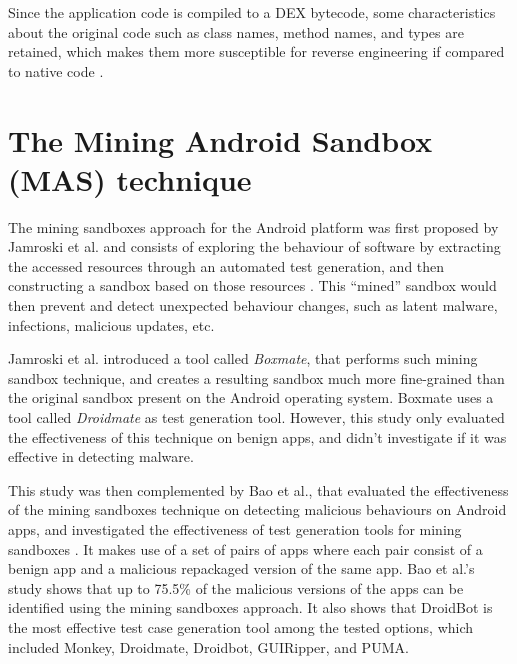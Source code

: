 Since the application code is compiled to a DEX bytecode, some characteristics about the original code such as class names, method names, and types are retained, which makes them more susceptible for reverse engineering if compared to native code \cite{hamilton_evaluation_2009}.

\section{The Mining Android Sandbox (MAS) technique}

The mining sandboxes approach for the Android platform was first proposed by Jamroski et al. and consists of exploring the behaviour of software by extracting the accessed resources through an automated test generation, and then constructing a sandbox based on those resources \cite{jamrozik_mining_2016}. This ``mined'' sandbox would then prevent and detect unexpected behaviour changes, such as latent malware, infections, malicious updates, etc.

Jamroski et al. introduced a tool called \textit{Boxmate}, that performs such mining sandbox technique, and creates a resulting sandbox much more fine-grained than the original sandbox present on the Android operating system. Boxmate uses a tool called \textit{Droidmate} as test generation tool. However, this study only evaluated the effectiveness of this technique on benign apps, and didn't investigate if it was effective in detecting malware.

This study was then complemented by Bao et al., that evaluated the effectiveness of the mining sandboxes technique on detecting malicious behaviours on Android apps, and investigated the effectiveness of test generation tools for mining sandboxes \cite{bao_mining_2018}. It makes use of a set of pairs of apps where each pair consist of a benign app and a malicious repackaged version of the same app. Bao et al.'s study shows that up to 75.5\% of the malicious versions of the apps can be identified using the mining sandboxes approach. It also shows that DroidBot \cite{li_droidbot_2017} is the most effective test case generation tool among the tested options, which included Monkey, Droidmate, Droidbot, GUIRipper, and PUMA.


